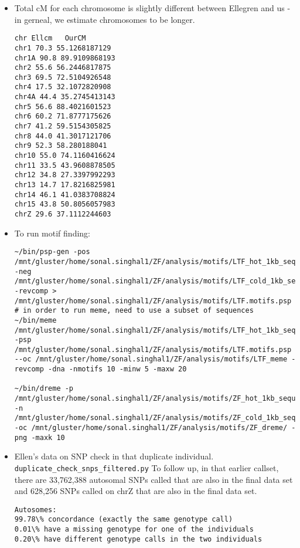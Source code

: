 \documentclass[idxtotoc,hyperref,openany,oneside]{labbook} %
\begin{document}
\begin{itemize}
\item Total cM for each chromosome is slightly different between Ellegren and us - in gerneal, we estimate chromosomes to be longer.
\begin{verbatim}
chr Ellcm	OurCM
chr1 70.3 55.1268187129
chr1A 90.8 89.9109868193
chr2 55.6 56.2446817875
chr3 69.5 72.5104926548
chr4 17.5 32.1072820908
chr4A 44.4 35.2745413143
chr5 56.6 88.4021601523
chr6 60.2 71.8777175626
chr7 41.2 59.5154305825
chr8 44.0 41.3017121706
chr9 52.3 58.280188041
chr10 55.0 74.1160416624
chr11 33.5 43.9608878505
chr12 34.8 27.3397992293
chr13 14.7 17.8216825981
chr14 46.1 41.0383708824
chr15 43.8 50.8056057983
chrZ 29.6 37.1112244603
\end{verbatim}
\item To run motif finding:
\begin{verbatim}
~/bin/psp-gen -pos /mnt/gluster/home/sonal.singhal1/ZF/analysis/motifs/LTF_hot_1kb_sequences.subset.fa -neg /mnt/gluster/home/sonal.singhal1/ZF/analysis/motifs/LTF_cold_1kb_sequences.subset.fa -revcomp > /mnt/gluster/home/sonal.singhal1/ZF/analysis/motifs/LTF.motifs.psp
# in order to run meme, need to use a subset of sequences
~/bin/meme /mnt/gluster/home/sonal.singhal1/ZF/analysis/motifs/LTF_hot_1kb_sequences.subset.fa -psp /mnt/gluster/home/sonal.singhal1/ZF/analysis/motifs/LTF.motifs.psp --oc /mnt/gluster/home/sonal.singhal1/ZF/analysis/motifs/LTF_meme -revcomp -dna -nmotifs 10 -minw 5 -maxw 20

~/bin/dreme -p /mnt/gluster/home/sonal.singhal1/ZF/analysis/motifs/ZF_hot_1kb_sequences.fa -n /mnt/gluster/home/sonal.singhal1/ZF/analysis/motifs/ZF_cold_1kb_sequences.fa -oc /mnt/gluster/home/sonal.singhal1/ZF/analysis/motifs/ZF_dreme/ -png -maxk 10
\end{verbatim}
\item Ellen's data on SNP check in that duplicate individual. \verb+duplicate_check_snps_filtered.py+ To follow up, in that earlier callset, there are 33,762,388 autosomal SNPs called that are also in the final data set and 628,256 SNPs called on chrZ that are also in the final data set. 
\begin{verbatim}
Autosomes:
99.78\% concordance (exactly the same genotype call)
0.01\% have a missing genotype for one of the individuals
0.20\% have different genotype calls in the two individuals


\end{verbatim}
\end{itemize}
\end{document}
